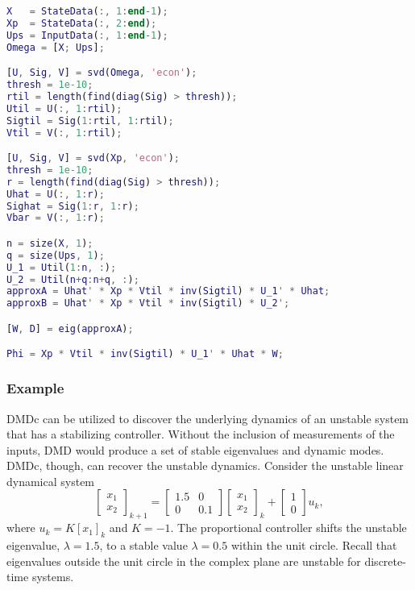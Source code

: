 \documentclass{article}
\begin{document}
\begin{lstlisting}[language=Matlab, caption={}]
X   = StateData(:, 1:end-1);
Xp  = StateData(:, 2:end);
Ups = InputData(:, 1:end-1);
Omega = [X; Ups];

[U, Sig, V] = svd(Omega, 'econ');
thresh = 1e-10;
rtil = length(find(diag(Sig) > thresh));
Util = U(:, 1:rtil);
Sigtil = Sig(1:rtil, 1:rtil);
Vtil = V(:, 1:rtil);

[U, Sig, V] = svd(Xp, 'econ');
thresh = 1e-10;
r = length(find(diag(Sig) > thresh));
Uhat = U(:, 1:r);
Sighat = Sig(1:r, 1:r);
Vbar = V(:, 1:r);

n = size(X, 1);
q = size(Ups, 1);
U_1 = Util(1:n, :);
U_2 = Util(n+q:n+q, :);
approxA = Uhat' * Xp * Vtil * inv(Sigtil) * U_1' * Uhat;
approxB = Uhat' * Xp * Vtil * inv(Sigtil) * U_2';

[W, D] = eig(approxA);

Phi = Xp * Vtil * inv(Sigtil) * U_1' * Uhat * W;
\end{lstlisting}

\vspace{1cm}

\subsubsection*{Example}

\vspace{1cm}

DMDc can be utilized to discover the underlying dynamics of an unstable system that
has a stabilizing controller. Without the inclusion of measurements of the inputs,
DMD would produce a set of stable eigenvalues and dynamic modes. DMDc, though,
can recover the unstable dynamics. Consider the unstable linear dynamical system
\[
    \begin{bmatrix} x_1 \\ x_2 \end{bmatrix}_{k+1}
    =
    \begin{bmatrix} 1.5 & 0 \\ 0 & 0.1 \end{bmatrix}
    \begin{bmatrix} x_1 \\ x_2 \end{bmatrix}_k
    +
    \begin{bmatrix} 1 \\ 0 \end{bmatrix} u_k, 
\]
where $u_k = K[x_1]_k$ and $K=-1$.  
The proportional controller shifts the unstable eigenvalue, $\lambda = 1.5$, 
to a stable value $\lambda = 0.5$ within the unit circle. 
Recall that eigenvalues outside the unit circle in the complex plane are unstable 
for discrete-time systems.  
\end{document}
